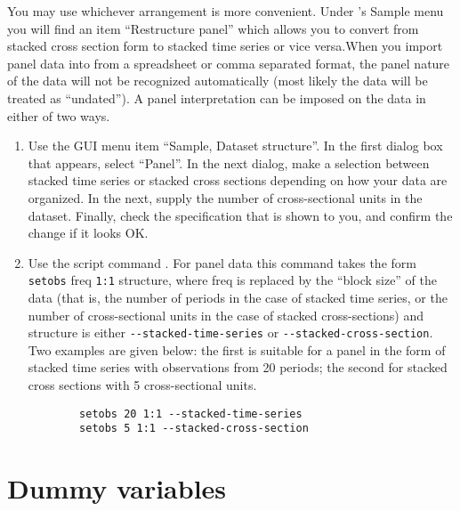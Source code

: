 You may use whichever arrangement is more convenient. Under
      's \textsf{Sample}
      menu you will find an item ``Restructure panel''
      which allows you to convert from stacked cross section form to
      stacked time series or vice versa.When you import panel data into
       from a spreadsheet or comma
      separated format, the panel nature of the data will not be
      recognized automatically (most likely the data will be treated
      as ``undated'').  A panel interpretation can be
      imposed on the data in either of two ways.
\begin{enumerate}
\item Use the  GUI menu item ``Sample, Dataset
	    structure''.  In the first dialog box that appears,
	  select ``Panel''.  In the next dialog, make a
	  selection between stacked time series or stacked cross
	  sections depending on how your data are organized.  In the
	  next, supply the number of cross-sectional units in the
	  dataset.  Finally, check the specification that is shown to
	  you, and confirm the change if it looks OK.
	
\item Use the script command .  For
	  panel data this command takes the form
	  \verb+setobs+ freq
	  \verb+1:1+ structure,
	  where freq is replaced by the
	  ``block size'' of the data (that is, the number
	  of periods in the case of stacked time series, or the number
	  of cross-sectional units in the case of stacked
	  cross-sections) and structure is
	  either \verb+--stacked-time-series+ or
	  \verb+--stacked-cross-section+.  Two examples
	  are given below: the first is suitable for a panel in the
	  form of stacked time series with observations from 20
	  periods; the second for stacked cross sections with 5
	  cross-sectional units.   
	
\begin{verbatim}
	    setobs 20 1:1 --stacked-time-series
	    setobs 5 1:1 --stacked-cross-section
	\end{verbatim}

\end{enumerate}



\section{Dummy variables}
\label{dummies}


